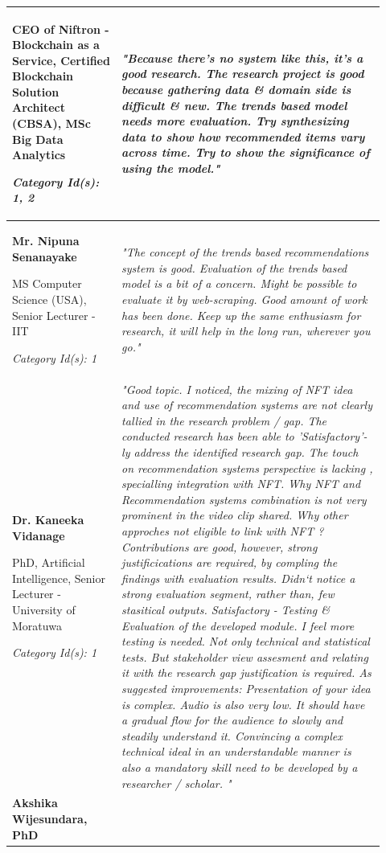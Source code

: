 \begin{longtable}{|p{0.27\linewidth}|p{0.655\linewidth}|}
CEO of Niftron - Blockchain as a Service, Certified Blockchain Solution Architect (CBSA), MSc Big Data Analytics

\textit{Category Id(s): 1, 2}
&  
\textit{"Because there's no system like this, it's a good research. The research project is good because gathering data \& domain side is difficult \& new.
The trends based model needs more evaluation. Try synthesizing data to show how recommended items vary across time. Try to show the significance of using the model."}
\\
\hline
\textbf{Mr. Nipuna Senanayake} 

MS Computer Science (USA), Senior Lecturer - IIT

\textit{Category Id(s): 1}
& 
\textit{"The concept of the trends based recommendations system is good. Evaluation of the trends based model is a bit of a concern. Might be possible to evaluate it by web-scraping.
Good amount of work has been done. Keep up the same enthusiasm for research, it will help in the long run, wherever you go."}
 \\
\hline
\textbf{Dr. Kaneeka Vidanage}

PhD, Artificial Intelligence, Senior Lecturer - University of Moratuwa

\textit{Category Id(s): 1}
& 
\textit{"Good topic. I noticed, the mixing of NFT idea and use of recommendation systems are not clearly tallied in the research problem / gap.
The conducted research has been able to 'Satisfactory'-ly address the identified research gap. The touch on recommendation systems perspective is lacking , specialling integration with NFT.
Why NFT and Recommendation systems combination is not very prominent in the video clip shared. Why other approches not eligible to link with NFT ?
Contributions are good, however, strong justificications are required, by compling the findings with evaluation results. Didn`t notice a strong evaluation segment, rather than, few stasitical outputs.
Satisfactory - Testing \& Evaluation of the developed module. I feel more testing is needed. Not only technical and statistical tests. But stakeholder view assesment and relating it with the research gap justification is required.
As suggested improvements: Presentation of your idea is complex. Audio is also very low.  It should have a gradual flow for the audience to slowly and steadily understand it. Convincing a complex technical ideal in an understandable manner is also a mandatory skill need to be developed by a researcher / scholar. 
"}
\\
\hline
\textbf{Akshika Wijesundara, PhD}


\end{longtable}
